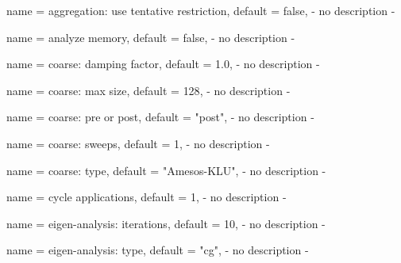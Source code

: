 \begin{parameter}{
    name    = {aggregation: use tentative restriction},
    default = {false},
}
- no description -
\end{parameter}

\begin{parameter}{
    name    = {analyze memory},
    default = {false},
}
- no description -
\end{parameter}

\begin{parameter}{
    name    = {coarse: damping factor},
    default = {1.0},
}
- no description -
\end{parameter}

\begin{parameter}{
    name    = {coarse: max size},
    default = {128},
}
- no description -
\end{parameter}

\begin{parameter}{
    name    = {coarse: pre or post},
    default = {"post"},
}
- no description -
\end{parameter}

\begin{parameter}{
    name    = {coarse: sweeps},
    default = {1},
}
- no description -
\end{parameter}

\begin{parameter}{
    name    = {coarse: type},
    default = {"Amesos-KLU"},
}
- no description -
\end{parameter}

\begin{parameter}{
    name    = {cycle applications},
    default = {1},
}
- no description -
\end{parameter}

\begin{parameter}{
    name    = {eigen-analysis: iterations},
    default = {10},
}
- no description -
\end{parameter}

\begin{parameter}{
    name    = {eigen-analysis: type},
    default = {"cg"},
}
- no description -
\end{parameter}

